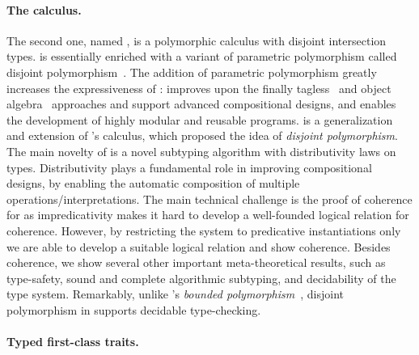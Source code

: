 \paragraph{The \fnamee calculus.}

The second one, named \fnamee, is a polymorphic calculus with disjoint
intersection types. \fnamee is essentially \namee enriched with a variant of
parametric polymorphism called disjoint polymorphism~\citep{alpuimdisjoint}. The
addition of parametric polymorphism greatly increases the expressiveness of
\namee: \fnamee improves upon the finally tagless~\citep{CARETTE_2009} and
object algebra~\citep{oliveira2012extensibility} approaches and support advanced
compositional designs, and enables the development of highly modular and
reusable programs. \fnamee is a generalization and extension of
\citeauthor{alpuimdisjoint}'s \fname calculus, which proposed the idea of
\emph{disjoint polymorphism}. The main novelty of \fnamee is a novel subtyping
algorithm with distributivity laws on types. Distributivity plays a fundamental
role in improving compositional designs, by enabling the automatic composition
of multiple operations/interpretations. The main technical challenge is the
proof of coherence for \fnamee as impredicativity makes it hard to develop a
well-founded logical relation for coherence. However, by restricting the system
to predicative instantiations only we are able to develop a suitable logical
relation and show coherence. Besides coherence, we show several other important
meta-theoretical results, such as type-safety, sound and complete algorithmic
subtyping, and decidability of the type system. Remarkably, unlike \fsub's
\emph{bounded polymorphism}~\citep{cardelli1985understanding}, disjoint polymorphism in \fnamee supports decidable
type-checking.



\paragraph{Typed first-class traits.}

